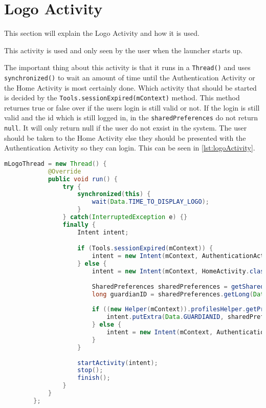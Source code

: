 \section{Logo Activity}
This section will explain the Logo Activity and how it is used.

This activity is used and only seen by the user when the launcher starts up.

The important thing about this activity is that it runs in a \verb +Thread()+ and uses \verb +synchronized()+ to wait an amount of time until the Authentication Activity or the Home Activity is most certainly done. Which activity that should be started is decided by the \verb +Tools.sessionExpired(mContext)+ method. This method returnes true or false over if the users login is still valid or not. If the login is still valid and the id which is still logged in, in the \verb +sharedPreferences+ do not return \verb +null+. It will only return null if the user do not exsist in the system. The user should be taken to the Home Activity else they should be presented with the Authentication Activity so they can login. This can be seen in \autoref{lst:logoActivity}.

\begin{lstlisting}[style=sourceCode, language=JAVA, caption=The Logo Activity and how it uses Thread and synchronized, label=lst:logoActivity] 
		mLogoThread = new Thread() {
	        @Override
	        public void run() {
	            try {
	            	synchronized(this) {
	            		wait(Data.TIME_TO_DISPLAY_LOGO);
	            	}
	            } catch(InterruptedException e) {}
	            finally {
	            	Intent intent;

	            	if (Tools.sessionExpired(mContext)) {
	            		intent = new Intent(mContext, AuthenticationActivity.class);
	            	} else {
	            		intent = new Intent(mContext, HomeActivity.class);
	            		
	            		SharedPreferences sharedPreferences = getSharedPreferences(Data.TIMERKEY, 0);
	            		long guardianID = sharedPreferences.getLong(Data.GUARDIANID, -1);
	            		
	            		if ((new Helper(mContext)).profilesHelper.getProfileById(guardianID) != null) {
	            			intent.putExtra(Data.GUARDIANID, sharedPreferences.getLong(Data.GUARDIANID, -1));
	            		} else {
	            			intent = new Intent(mContext, AuthenticationActivity.class);
	            		}
	            	}
	            	
	                startActivity(intent);
	                stop();
	                finish();
	            }
	        }
	    };
\end{lstlisting}
